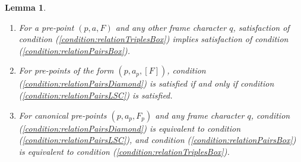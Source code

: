 \documentclass{article}[a4paper]
\newtheorem{lemma}{Lemma}%
\theoremstyle{definition}
\begin{document}
\begin{lemma}
\label{result:relationRelationships}
\begin{enumerate}
    \item For a pre-point $(p,a,F)$ and any other frame character $q$, satisfaction of condition (\ref{condition:relationTriplesBox}) implies satisfaction of condition (\ref{condition:relationPairsBox}).
    
    \item For pre-points of the form $(p, a_p,[F])$, condition (\ref{condition:relationPairsDiamond}) is satisfied if and only if condition (\ref{condition:relationPairsLSC}) is satisfied.
    
    
    \item 
    \label{result:tripleRelationReduced}
    For canonical pre-points $(p,a_p,F_p)$ and any frame character $q$, 
    condition (\ref{condition:relationPairsDiamond}) is equivalent to condition  (\ref{condition:relationPairsLSC}), and 
    condition (\ref{condition:relationPairsBox}) is equivalent to condition (\ref{condition:relationTriplesBox}). 
    
    \end{enumerate}
\end{lemma}
\end{document}
